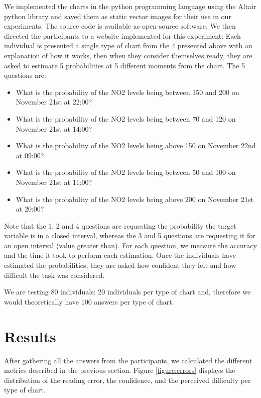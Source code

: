 \documentclass[a4paper,3p,sort&compress]{elsarticle}
\begin{document}
We implemented the charts in the python programming language using the Altair python library
\cite{vanderplas2018altair} and saved them as static vector images for their use in our experiments. The source code is
available as open-source software. We then directed the participants to a website implemented for this experiment:
Each individual is presented a
single type of chart from the 4 presented above with an explanation of how it works,
then when they consider themselves ready, they are asked to estimate 5 probabilities at 5 different moments from the chart.
The 5 questions are:
\begin{itemize}
  \item What is the probability of the NO2 levels being between 150 and 200 on November 21st at 22:00?
  \item What is the probability of the NO2 levels being between 70 and 120 on November 21st at 14:00?
  \item What is the probability of the NO2 levels being above 150 on November 22nd at 09:00?
  \item What is the probability of the NO2 levels being between 50 and 100 on November 21st at 11:00?
  \item What is the probability of the NO2 levels being above 200 on November 21st at 20:00?
\end{itemize}

Note that the 1, 2 and 4 questions are requesting the probability the target variable is in a closed interval, whereas
the 3 and 5 questions are requesting it for an open interval (value greater than).
For each question, we measure the accuracy and the time it took to
perform each estimation. Once the individuals have estimated the probabilities, they are asked how confident they
felt and how difficult the task was considered.

We are testing 80 individuals: 20 individuals per type of chart and, therefore we would theoretically have 100 answers per
type of chart.

\section{Results}
\label{sec:results}


After gathering all the answers from the participants, we calculated the different metrics described in the previous section.
 Figure \ref{figure:errors} displays
the distribution of the reading error, the confidence, and the perceived difficulty per type of chart.
\end{document}
